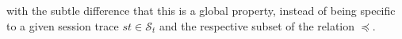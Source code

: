 \documentclass[acmlarge, ,11pt]{acmart}
\begin{document}
with the subtle difference that this is a global property, instead of being specific to a given session trace $st\in \mathcal{S}_t$ and the respective subset of the relation $\preccurlyeq$.

%
%
\end{document}
